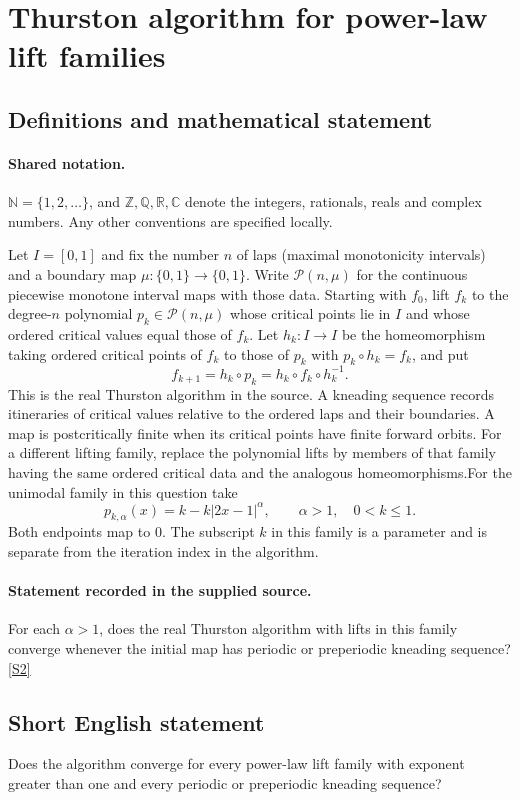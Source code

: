 \documentclass[11pt]{article}
\newcommand{\sref}[2]{\hyperlink{source:#1:#2}{[S#2]}}
\begin{document}
\section{Thurston algorithm for power-law lift families}\label{statement}

\subsection{Definitions and mathematical statement}

\paragraph{Shared notation.}$\mathbb N=\{1,2,\ldots\}$, and $\mathbb Z,\mathbb Q,\mathbb R,\mathbb C$ denote the integers, rationals, reals and complex numbers. Any other conventions are specified locally.


Let $I=[0,1]$ and fix the number $n$ of laps (maximal monotonicity intervals) and a boundary map $\mu:\{0,1\}\to\{0,1\}$. Write $\mathcal P(n,\mu)$ for the continuous piecewise monotone interval maps with those data. Starting with $f_0$, lift $f_k$ to the degree-$n$ polynomial $p_k\in\mathcal P(n,\mu)$ whose critical points lie in $I$ and whose ordered critical values equal those of $f_k$. Let $h_k:I\to I$ be the homeomorphism taking ordered critical points of $f_k$ to those of $p_k$ with $p_k\circ h_k=f_k$, and put
\[f_{k+1}=h_k\circ p_k=h_k\circ f_k\circ h_k^{-1}.\]
This is the real Thurston algorithm in the source. A kneading sequence records itineraries of critical values relative to the ordered laps and their boundaries. A map is postcritically finite when its critical points have finite forward orbits. For a different lifting family, replace the polynomial lifts by members of that family having the same ordered critical data and the analogous homeomorphisms.For the unimodal family in this question take
\[p_{k,\alpha}(x)=k-k|2x-1|^\alpha,\qquad \alpha>1,\quad 0<k\leq1.\]
Both endpoints map to $0$. The subscript $k$ in this family is a parameter and is separate from the iteration index in the algorithm.
\paragraph{Statement recorded in the supplied source.}
For each $\alpha>1$, does the real Thurston algorithm with lifts in this family converge whenever the initial map has periodic or preperiodic kneading sequence? \sref{statement}{2}
\subsection{Short English statement}
Does the algorithm converge for every power-law lift family with exponent greater than one and every periodic or preperiodic kneading sequence?
\end{document}
